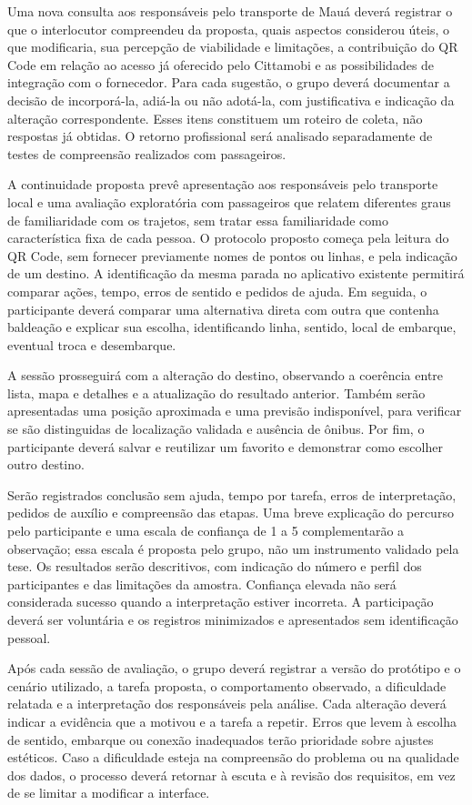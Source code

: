 \documentclass[12pt,oneside,a4paper,brazil,chapter=TITLE]{abntex2}
\begin{document}
Uma nova consulta aos responsáveis pelo transporte de Mauá deverá registrar o que o interlocutor compreendeu da proposta, quais aspectos considerou úteis, o que modificaria, sua percepção de viabilidade e limitações, a contribuição do QR Code em relação ao acesso já oferecido pelo Cittamobi e as possibilidades de integração com o fornecedor. Para cada sugestão, o grupo deverá documentar a decisão de incorporá-la, adiá-la ou não adotá-la, com justificativa e indicação da alteração correspondente. Esses itens constituem um roteiro de coleta, não respostas já obtidas. O retorno profissional será analisado separadamente de testes de compreensão realizados com passageiros.

A continuidade proposta prevê apresentação aos responsáveis pelo transporte local e uma avaliação exploratória com passageiros que relatem diferentes graus de familiaridade com os trajetos, sem tratar essa familiaridade como característica fixa de cada pessoa. O protocolo proposto começa pela leitura do QR Code, sem fornecer previamente nomes de pontos ou linhas, e pela indicação de um destino. A identificação da mesma parada no aplicativo existente permitirá comparar ações, tempo, erros de sentido e pedidos de ajuda. Em seguida, o participante deverá comparar uma alternativa direta com outra que contenha baldeação e explicar sua escolha, identificando linha, sentido, local de embarque, eventual troca e desembarque.

A sessão prosseguirá com a alteração do destino, observando a coerência entre lista, mapa e detalhes e a atualização do resultado anterior. Também serão apresentadas uma posição aproximada e uma previsão indisponível, para verificar se são distinguidas de localização validada e ausência de ônibus. Por fim, o participante deverá salvar e reutilizar um favorito e demonstrar como escolher outro destino.

Serão registrados conclusão sem ajuda, tempo por tarefa, erros de interpretação, pedidos de auxílio e compreensão das etapas. Uma breve explicação do percurso pelo participante e uma escala de confiança de 1 a 5 complementarão a observação; essa escala é proposta pelo grupo, não um instrumento validado pela tese. Os resultados serão descritivos, com indicação do número e perfil dos participantes e das limitações da amostra. Confiança elevada não será considerada sucesso quando a interpretação estiver incorreta. A participação deverá ser voluntária e os registros minimizados e apresentados sem identificação pessoal.

Após cada sessão de avaliação, o grupo deverá registrar a versão do protótipo e o cenário utilizado, a tarefa proposta, o comportamento observado, a dificuldade relatada e a interpretação dos responsáveis pela análise. Cada alteração deverá indicar a evidência que a motivou e a tarefa a repetir. Erros que levem à escolha de sentido, embarque ou conexão inadequados terão prioridade sobre ajustes estéticos. Caso a dificuldade esteja na compreensão do problema ou na qualidade dos dados, o processo deverá retornar à escuta e à revisão dos requisitos, em vez de se limitar a modificar a interface.
\end{document}
